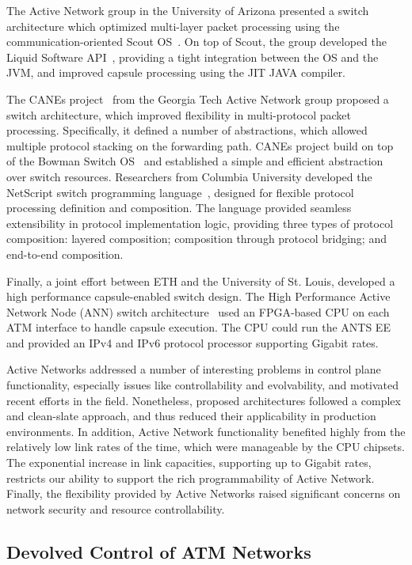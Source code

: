 The Active Network group in the University of Arizona presented a switch
architecture which optimized multi-layer packet processing using the
communication-oriented Scout OS~. On top of Scout, the group
developed the Liquid Software API~, providing a tight
integration between the OS and the JVM, and improved capsule processing using
the JIT JAVA compiler. 

The CANEs project~ from the Georgia Tech Active Network group
proposed a switch architecture, which improved flexibility in multi-protocol
packet processing. Specifically, it defined a number of abstractions, which
allowed multiple protocol stacking on the forwarding path. CANEs project build
on top of the Bowman Switch OS~ and established a simple and
efficient abstraction over switch resources.  Researchers from Columbia
University developed the NetScript switch programming
language~, designed for flexible protocol processing
definition and composition. The language provided seamless extensibility in
protocol implementation logic, providing three types of protocol composition:
layered composition; composition through protocol bridging; and end-to-end
composition.

Finally, a joint effort between ETH and the University of St. Louis, developed a
high performance capsule-enabled switch design. The High Performance Active
Network Node (ANN) switch architecture~ used an FPGA-based
CPU on each ATM interface to handle capsule execution.  The CPU could run the
ANTS EE and provided an IPv4 and IPv6 protocol processor supporting Gigabit rates. 

Active Networks addressed a number of interesting problems in control plane
functionality, especially issues like controllability and evolvability, and
motivated recent efforts in the field.  Nonetheless, proposed architectures
followed a complex and clean-slate approach, and thus reduced their applicability
in production environments. In addition, Active Network functionality
benefited highly from the relatively low link rates of the time, which were manageable
by the CPU chipsets. The exponential increase in link capacities, supporting up
to Gigabit rates, restricts our ability to support the rich programmability of
Active Network.  Finally, the flexibility provided by Active Networks raised
significant concerns on network security and resource controllability.  

\subsection{Devolved Control of ATM Networks}

